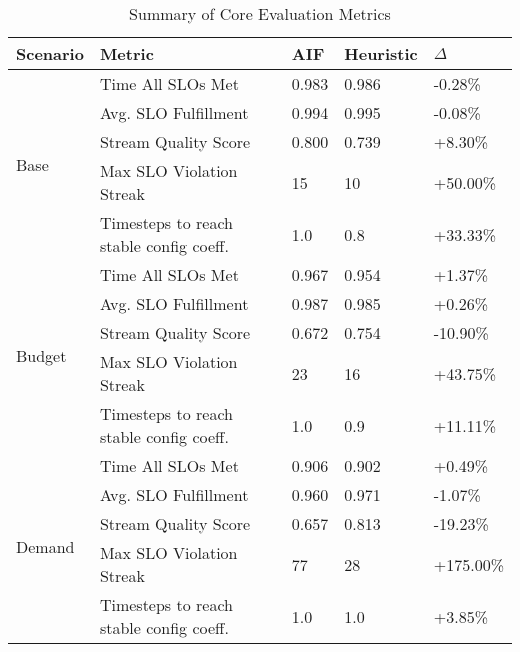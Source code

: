\begin{table}[h!]
\centering
\caption{Summary of Core Evaluation Metrics}
\label{tab:results_summary}
\begin{tabular}{@{}lllll@{}}
\toprule
\textbf{Scenario} & \textbf{Metric} & \textbf{AIF} & \textbf{Heuristic} & \textbf{$\Delta$} \\
\midrule
\multirow{5}{*}{Base} & Time All SLOs Met & 0.983 & 0.986 & -0.28\% \\
& Avg. SLO Fulfillment & 0.994 & 0.995 & -0.08\% \\
& Stream Quality Score & 0.800 & 0.739 & +8.30\% \\
& Max SLO Violation Streak & 15 & 10 & +50.00\% \\
& Timesteps to reach stable config coeff. & 1.0 & 0.8 & +33.33\% \\
\midrule
\multirow{5}{*}{Budget} & Time All SLOs Met & 0.967 & 0.954 & +1.37\% \\
& Avg. SLO Fulfillment & 0.987 & 0.985 & +0.26\% \\
& Stream Quality Score & 0.672 & 0.754 & -10.90\% \\
& Max SLO Violation Streak & 23 & 16 & +43.75\% \\
& Timesteps to reach stable config coeff. & 1.0 & 0.9 & +11.11\% \\
\midrule
\multirow{5}{*}{Demand} & Time All SLOs Met & 0.906 & 0.902 & +0.49\% \\
& Avg. SLO Fulfillment & 0.960 & 0.971 & -1.07\% \\
& Stream Quality Score & 0.657 & 0.813 & -19.23\% \\
& Max SLO Violation Streak & 77 & 28 & +175.00\% \\
& Timesteps to reach stable config coeff. & 1.0 & 1.0 & +3.85\% \\
\bottomrule
\end{tabular}
\end{table}